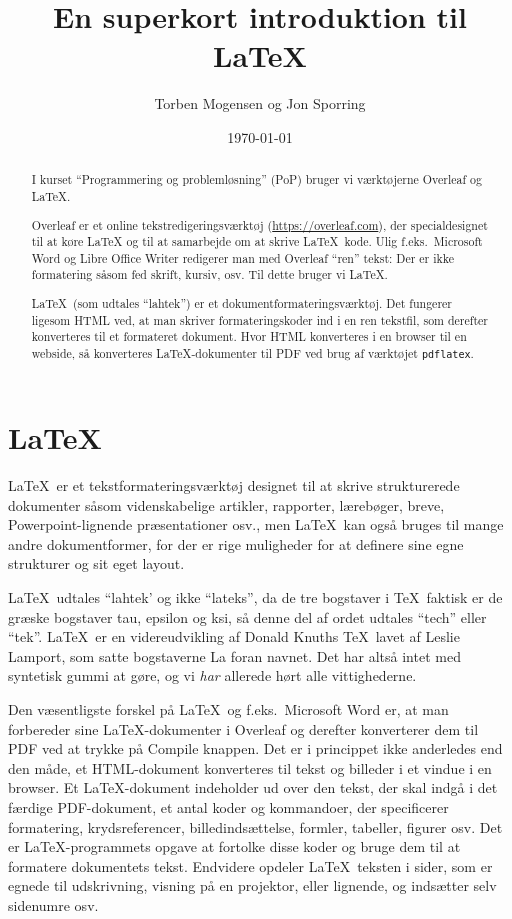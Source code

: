 \documentclass[a4paper]{report}
\begin{document}
\title{En superkort introduktion til \LaTeX}

\author{Torben Mogensen og Jon Sporring}
\date{\today}

\maketitle

\begin{abstract}
I kurset ``Programmering og problemløsning'' (PoP) bruger vi
værktøjerne Overleaf og \LaTeX.

Overleaf er et online tekstredigeringsværktøj
(\url{https://overleaf.com}), der specialdesignet til at køre \LaTeX
og til at samarbejde om at skrive \LaTeX\ kode.  Ulig f.eks.\ Microsoft
Word og Libre Office Writer redigerer man med Overleaf ``ren'' tekst:
Der er ikke formatering såsom fed skrift, kursiv, osv.  Til dette
bruger vi \LaTeX.

\LaTeX\ (som udtales ``lahtek'') er et dokumentformateringsværktøj.
Det fungerer ligesom HTML ved, at man skriver formateringskoder ind i
en ren tekstfil, som derefter konverteres til et formateret dokument.
Hvor HTML konverteres i en browser til en webside, så konverteres
\LaTeX-dokumenter til PDF ved brug af værktøjet \texttt{pdflatex}.
\end{abstract}

\tableofcontents

\chapter{\LaTeX}

\LaTeX\ er et tekstformateringsværktøj designet til at skrive
strukturerede dokumenter såsom videnskabelige artikler, rapporter,
lærebøger, breve, Powerpoint-lignende præsentationer osv., men
\LaTeX\ kan også bruges til mange andre dokumentformer, for der er
rige muligheder for at definere sine egne strukturer og sit eget
layout.

\LaTeX\ udtales ``lahtek' og ikke ``lateks'', da de tre bogstaver i
\TeX\ faktisk er de græske bogstaver tau, epsilon og ksi, så denne del
af ordet udtales ``tech'' eller ``tek''. \LaTeX\ er en videreudvikling
af Donald Knuths \TeX\ lavet af Leslie Lamport, som satte bogstaverne
\textsf{La} foran navnet.  Det har altså intet med syntetisk gummi at
gøre, og vi \emph{har} allerede hørt alle vittighederne.

Den væsentligste forskel på \LaTeX\ og f.eks.~Microsoft Word er, at
man forbereder sine \LaTeX-dokumenter i Overleaf og derefter
konverterer dem til PDF ved at trykke på Compile knappen.  Det er i
princippet ikke anderledes end den måde, et HTML-dokument konverteres
til tekst og billeder i et vindue i en browser.  Et \LaTeX-dokument
indeholder ud over den tekst, der skal indgå i det færdige
PDF-dokument, et antal koder og kommandoer, der specificerer
formatering, krydsreferencer, billedindsættelse, formler, tabeller,
figurer osv.  Det er \LaTeX-programmets opgave at fortolke disse koder
og bruge dem til at formatere dokumentets tekst.  Endvidere opdeler
\LaTeX\ teksten i sider, som er egnede til udskrivning, visning på en
projektor, eller lignende, og indsætter selv sidenumre osv.
\end{document}

